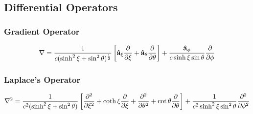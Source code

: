 \documentclass[fontsize=11pt, %
                             paper=a4, %
                             twoside, %
                             captions=tableheading,
                             index=totoc,
                             hyperref]{labbook}
\begin{document}
\begin{addmargin}[4cm]{0cm}
\subsection{Differential Operators}
\subsubsection{Gradient Operator}
\begin{equation}
\nabla=\frac{1}{c(\sinh^2\xi+\sin^2\theta)^{\frac{1}{2}}}\left[\mathbf{\hat{a}}_{\xi} \frac{\partial }{\partial \xi}+\mathbf{\hat{a}}_{\theta}\frac{\partial }{\partial \theta}\right]+\frac{\mathbf{\hat{a}}_{\phi}}{c\sinh\xi\sin\theta}\frac{\partial }{\partial \phi}
\end{equation}
\subsubsection{Laplace's Operator}
\begin{equation}
\nabla^2=\frac{1}{c^2(\sinh^2\xi+\sin^2\theta)}\left[\frac{\partial^2 }{\partial \xi^2}+\coth\xi\frac{\partial }{\partial \xi}+\frac{\partial^2 }{\partial \theta^2}+\cot\theta\frac{\partial }{\partial \theta}\right]+\frac{1}{c^2\sinh^2\xi\sin^2\theta}\frac{\partial^2 }{\partial \phi^2}
\end{equation}

\end{addmargin}
\end{document}
